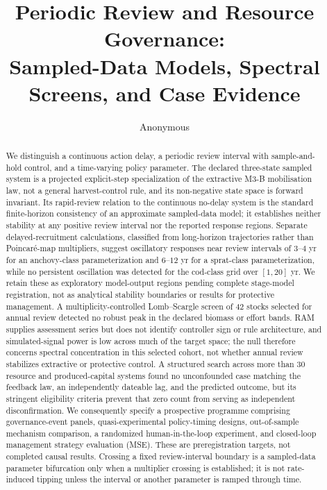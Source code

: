 \documentclass[11pt]{article}
\title{Periodic Review and Resource Governance:\\
Sampled-Data Models, Spectral Screens, and Case Evidence}
\author{Anonymous}
\date{}
\begin{document}
\maketitle

\begin{abstract}
We distinguish a continuous action delay, a periodic review interval with sample-and-hold control, and a time-varying policy parameter. The declared three-state sampled system is a projected explicit-step specialization of the extractive M3-B mobilisation law, not a general harvest-control rule, and its non-negative state space is forward invariant. Its rapid-review relation to the continuous no-delay system is the standard finite-horizon consistency of an approximate sampled-data model; it establishes neither stability at any positive review interval nor the reported response regions. Separate delayed-recruitment calculations, classified from long-horizon trajectories rather than Poincar\'e-map multipliers, suggest oscillatory responses near review intervals of $3$--$4$ yr for an anchovy-class parameterization and $6$--$12$ yr for a sprat-class parameterization, while no persistent oscillation was detected for the cod-class grid over $[1,20]$ yr. We retain these as exploratory model-output regions pending complete stage-model registration, not as analytical stability boundaries or results for protective management. A multiplicity-controlled Lomb--Scargle screen of 42 stocks selected for annual review detected no robust peak in the declared biomass or effort bands. RAM supplies assessment series but does not identify controller sign or rule architecture, and simulated-signal power is low across much of the target space; the null therefore concerns spectral concentration in this selected cohort, not whether annual review stabilizes extractive or protective control. A structured search across more than 30 resource and produced-capital systems found no unconfounded case matching the feedback law, an independently dateable lag, and the predicted outcome, but its stringent eligibility criteria prevent that zero count from serving as independent disconfirmation. We consequently specify a prospective programme comprising governance-event panels, quasi-experimental policy-timing designs, out-of-sample mechanism comparison, a randomized human-in-the-loop experiment, and closed-loop management strategy evaluation (MSE). These are preregistration targets, not completed causal results. Crossing a fixed review-interval boundary is a sampled-data parameter bifurcation only when a multiplier crossing is established; it is not rate-induced tipping unless the interval or another parameter is ramped through time.
\end{abstract}
\end{document}
